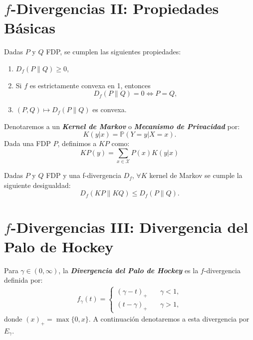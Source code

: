 \section{$f$-Divergencias II: Propiedades B\'asicas}

\begin{theorem}\cite{polyanskiy2014lecture}
Dadas $P$ y $Q$ FDP, se cumplen las siguientes propiedades:
\begin{enumerate}[label=(\alph*)]
    \item $D_f(P\|Q)\geq0$,
    \item Si $f$ es estrictamente convexa en 1, entonces
    \begin{equation*}
        D_f(P\|Q)=0\iff P=Q,
    \end{equation*}
    \item $(P,Q)\mapsto D_f(P\|Q)$ es convexa.
\end{enumerate}
\end{theorem}
\begin{notation}\cite{polyanskiy2014lecture}
    Denotaremos a un \textbf{\textit{Kernel de Markov}} o \textbf{\textit{Mecanismo de Privacidad}} por:
    \begin{equation*}
        K(y|x)=\mathbb{P}(Y=y|X=x).
    \end{equation*}
    Dada una FDP $P$, definimos a $KP$ como:
    \begin{equation*}
        KP(y)=\sum_{x\in\mathcal{X}}P(x)K(y|x)
    \end{equation*}
\end{notation}

\begin{theorem}\cite{polyanskiy2014lecture}
    Dadas $P$ y $Q$ FDP y una f-divergencia $D_f$, $\forall K$ kernel de Markov se cumple la siguiente desigualdad:
    \begin{equation}\label{eq:DPI}
        D_f(KP\|KQ)\leq D_f(P\|Q).
    \end{equation}
\end{theorem}

\section{$f$-Divergencias III: Divergencia del Palo de Hockey}

\begin{definition}
    Para $\gamma\in(0,\infty)$, la \textbf{\textit{Divergencia del Palo de Hockey}} es la $f$-divergencia definida por:
    \begin{align}\label{eq:Hockey}
         f_\gamma(t)=
         \begin{cases}
             (\gamma-t)_+ &\quad{\gamma<1,}\\
             (t-\gamma)_+ &\quad{\gamma>1},
         \end{cases}
    \end{align}
    donde $(x)_+=\max\{0,x\}$.
    A continuaci\'on denotaremos a esta divergencia por $E_{\gamma}$.
\end{definition}

